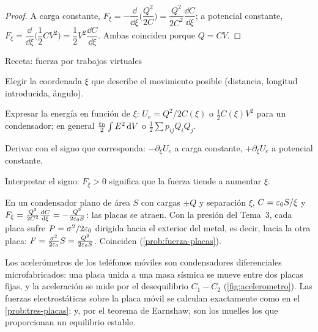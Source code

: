 \begin{proof}
A carga constante, $F_\xi=-\dfrac{\dd}{\dd\xi}\Big(\dfrac{Q^2}{2C}\Big)=\dfrac{Q^2}{2C^2}\dfrac{\dd C}{\dd\xi}$; a potencial constante, $F_\xi=\dfrac{\dd}{\dd\xi}\Big(\dfrac12CV^2\Big)=\dfrac12V^2\dfrac{\dd C}{\dd\xi}$.
Ambas coinciden porque $Q=CV$.
\end{proof}

\begin{metodo}{Receta: fuerza por trabajos virtuales}
\begin{pasos}
  \item Elegir la coordenada $\xi$ que describe el movimiento posible (distancia, longitud introducida, ángulo).
  \item Expresar la energía en función de $\xi$: $U_e=Q^2/2C(\xi)$ o $\frac12C(\xi)V^2$ para un condensador; en general $\frac{\varepsilon_0}{2}\int E^2\mathop{}\!\mathrm{d} V$ o
        $\frac12\sum p_{ij}Q_iQ_j$.
  \item Derivar con el signo que corresponda: $-\partial_\xi U_e$ a carga constante, $+\partial_\xi U_e$ a potencial constante.
  \item Interpretar el signo: $F_\xi>0$ significa que la fuerza tiende a aumentar $\xi$.
\end{pasos}
\end{metodo}

\begin{ejemplo}\label{ej:presion}
En un condensador plano de área $S$ con cargas $\pm Q$ y separación $\xi$, $C=\varepsilon_0 S/\xi$ y $F_\xi=\frac{Q^2}{2C^2}\frac{\mathop{}\!\mathrm{d} C}{\mathop{}\!\mathrm{d}\xi}=-\frac{Q^2}{2\varepsilon_0 S}$: las placas se atraen.
Con la presión del Tema~3, cada placa sufre $P=\sigma^2/2\varepsilon_0$ dirigida hacia el exterior del metal, es decir, hacia la otra placa:
$F=\frac{\sigma^2}{2\varepsilon_0}S=\frac{Q^2}{2\varepsilon_0 S}$. Coinciden (\cref{prob:fuerza-placas}).
\end{ejemplo}

\begin{ejemplo}\label{ej:acelerometro}
Los acelerómetros de los teléfonos móviles son condensadores diferenciales microfabricados: una placa unida a una masa sísmica se mueve
entre dos placas fijas, y la aceleración se mide por el desequilibrio $C_1-C_2$ (\cref{fig:acelerometro}). Las fuerzas electrostáticas sobre la
placa móvil se calculan exactamente como en el \cref{prob:tres-placas}; y, por el teorema de Earnshaw, son los muelles los que proporcionan un
equilibrio estable.
\end{ejemplo}


